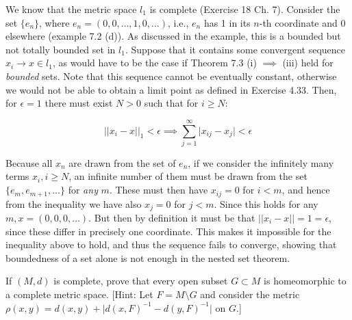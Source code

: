 \begin{solution}
    
    We know that the metric space $l_1$ is complete (Exercise 18 Ch. 7).
    Consider the set $\{e_n\}$, where $e_n = (0, 0, \ldots, 1, 0, \ldots)$, i.e., $e_n$ has 1 in its $n$-th coordinate and 0 elsewhere (example 7.2 (d)).
    As discussed in the example, this is a bounded but not totally bounded set in $l_1$.
    Suppose that it contains some convergent sequence $x_i \rightarrow x \in l_1$, as would have to be the case if Theorem 7.3 (i) $\implies$ (iii) held for \textit{bounded} sets.
    Note that this sequence cannot be eventually constant, otherwise we would not be able to obtain a limit point as defined in Exercise 4.33.
    Then, for $\epsilon = 1$ there must exist $N > 0$ such that for $i \geq N$:

    \[\lvert \lvert x_i - x \rvert \rvert _1 < \epsilon \implies \sum_{j=1}^{\infty} \lvert x_{ij} - x_j \rvert < \epsilon\]

    Because all $x_n$ are drawn from the set of $e_n$, if we consider the infinitely many terms $x_i, i \geq N$, an infinite number of them must be drawn from the set $\{e_m, e_{m + 1}, \ldots\}$ for \textit{any} $m$.
    These must then have $x_{ij} = 0$ for $i < m$, and hence from the inequality we have also $x_j = 0$ for $j < m$.
    Since this holds for any $m, x = (0, 0, 0, \ldots)$.
    But then by definition it must be that $\lvert \lvert x_i - x \rvert \rvert = 1 = \epsilon$, since these differ in precisely one coordinate.
    This makes it impossible for the inequality above to hold, and thus the sequence fails to converge, showing that boundedness of a set alone is not enough in the nested set theorem.
\end{solution}

\begin{exercise}{30}
    If $(M, d)$ is complete, prove that every open subset $G \subset M$ is homeomorphic to a complete metric space.
    [Hint: Let $F = M \setminus G$ and consider the metric $\rho(x, y) = d(x, y) + \lvert d(x, F)^{-1} - d(y, F)^{-1} \rvert$ on $G$.]
\end{exercise}

